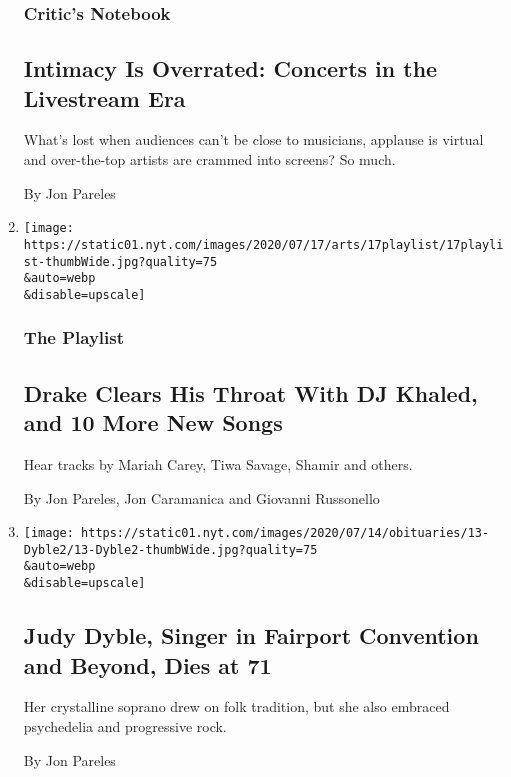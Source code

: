 \begin{enumerate}
  \hypertarget{critics-notebook}{%
  \subsubsection{Critic's Notebook}\label{critics-notebook}}

  \hypertarget{intimacy-is-overrated-concerts-in-the-livestream-era}{%
  \subsection{Intimacy Is Overrated: Concerts in the Livestream
  Era}\label{intimacy-is-overrated-concerts-in-the-livestream-era}}

  What's lost when audiences can't be close to musicians, applause is
  virtual and over-the-top artists are crammed into screens? So much.

  By Jon Pareles
\item
  \href{/2020/07/17/arts/music/playlist-drake-dj-khaled-mariah-carey.html}{}

  \texttt{[image: https://static01.nyt.com/images/2020/07/17/arts/17playlist/17playlist-thumbWide.jpg?quality=75\\\&auto=webp\\\&disable=upscale]}

  \hypertarget{the-playlist-2}{%
  \subsubsection{The Playlist}\label{the-playlist-2}}

  \hypertarget{drake-clears-his-throat-with-dj-khaled-and-10-more-new-songs}{%
  \subsection{Drake Clears His Throat With DJ Khaled, and 10 More New
  Songs}\label{drake-clears-his-throat-with-dj-khaled-and-10-more-new-songs}}

  Hear tracks by Mariah Carey, Tiwa Savage, Shamir and others.

  By Jon Pareles, Jon Caramanica and Giovanni Russonello
\item
  \href{/2020/07/13/arts/music/judy-dyble-dead.html}{}

  \texttt{[image: https://static01.nyt.com/images/2020/07/14/obituaries/13-Dyble2/13-Dyble2-thumbWide.jpg?quality=75\\\&auto=webp\\\&disable=upscale]}

  \hypertarget{judy-dyble-singer-in-fairport-convention-and-beyond-dies-at-71}{%
  \subsection{Judy Dyble, Singer in Fairport Convention and Beyond, Dies
  at
  71}\label{judy-dyble-singer-in-fairport-convention-and-beyond-dies-at-71}}

  Her crystalline soprano drew on folk tradition, but she also embraced
  psychedelia and progressive rock.

  By Jon Pareles
\end{enumerate}

